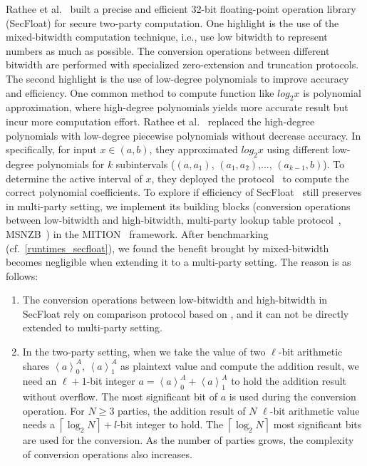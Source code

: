 Rathee et al.~\cite{rathee2022secfloat} built a precise and efficient 32-bit floating-point operation library (SecFloat) for secure two-party computation. One highlight is the use of the mixed-bitwidth computation technique, i.e., use low bitwidth to represent numbers as much as possible. The conversion operations between different bitwidth are performed with specialized zero-extension and truncation \twopc protocols.
The second highlight is the use of low-degree polynomials to improve accuracy and efficiency.
One common method to compute function like $log_{2}x$ is polynomial approximation, where high-degree polynomials yields more accurate result but incur more computation effort. Rathee et al.~\cite{rathee2022secfloat} replaced the high-degree polynomials with low-degree piecewise polynomials without decrease accuracy. In specifically, for input $x\in \left(a,b\right) $, they approximated $log_2 x$ using different low-degree polynomials for $k$ subintervals ($\left(a, a_1\right) $, $\left(a_1, a_2\right)  $,$\ldots$, $\left(a_{k-1}, b\right) $). To determine the active interval of $x$, they deployed the \lut protocol~\cite{dessouky2017pushing} to compute the correct polynomial coefficients.
To explore if efficiency of SecFloat~\cite{rathee2022secfloat} still preserves in multi-party setting, we implement its building blocks (conversion operations between low-bitwidth and high-bitwidth, multi-party lookup table protocol~\cite{keller2017faster}, MSNZB~\cite{rathee2021sirnn}) in the MITION~\cite{braun2022motion} framework. After benchmarking (cf.~\autoref{runtimes_secfloat}), we found the benefit brought by mixed-bitwidth becomes negligible when extending it to a multi-party setting. The reason is as follows:
\begin{enumerate}
    \item The conversion operations between low-bitwidth and high-bitwidth in SecFloat rely on \twopc comparison protocol based on \ot, and it can not be directly extended to multi-party setting.
    \item In the two-party setting, when we take the value of two $\ell$-bit arithmetic shares $\left\langle a\right\rangle^A_0 $, $\left\langle a\right\rangle^A_1$ as plaintext value and compute the addition result, we need an $\ell+1$-bit integer $a =\left\langle a\right\rangle^A_0 +\left\langle a\right\rangle^A_1 $ to hold the addition result without overflow. The most significant bit of $a$ is used during the conversion operation. For $N\geq 3$ parties, the addition result of $N$ $\ell$-bit arithmetic value needs a $\left\lceil \log_2{N}\right\rceil +l$-bit integer to hold. The $\left\lceil \log_2{N}\right\rceil$ most significant bits are used for the conversion. As the number of parties grows, the complexity of conversion operations also increases.
\end{enumerate}

